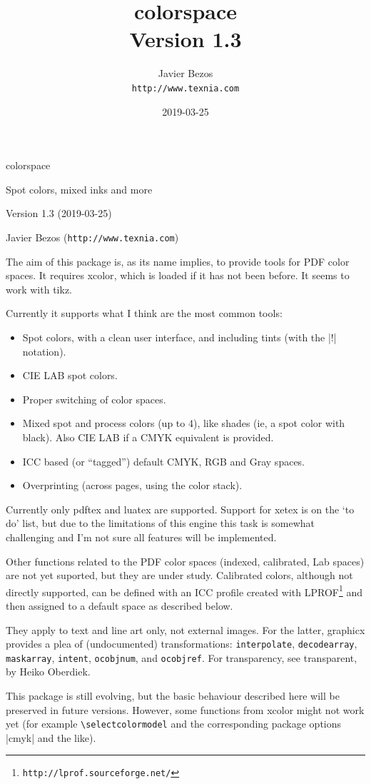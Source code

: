 \documentclass[a4paper]{ltxguide}
\title{\textsf{colorspace}\\\large Version 1.3}
\author{Javier Bezos\\\texttt{http://www.texnia.com}}
\date{2019-03-25}
\begin{document}
{\fontsize{48}{48}\selectfont colorspace\par}
{\LARGE Spot colors, mixed inks and more\par}
\vspace*{1ex}
Version 1.3 (2019-03-25)\par
Javier Bezos (\texttt{http://www.texnia.com})

\vspace*{6ex}

The aim of this package is, as its name implies, to provide tools for
PDF color spaces. It requires \textsf{xcolor}, which is loaded if it
has not been before. It seems to work with \textsf{tikz}.

Currently it supports what I think are the most common tools:
\begin{itemize}
\item Spot colors, with a clean user interface, and including tints
  (with the |!| notation).
\item CIE LAB spot colors.
\item Proper switching of color spaces.
\item Mixed spot and process colors (up to 4), like shades (ie, a spot
  color with black). Also CIE LAB if a CMYK equivalent is provided.
\item ICC based (or ``tagged'') default CMYK, RGB and Gray spaces.
\item Overprinting (across pages, using the color stack).
\end{itemize}
Currently only \textsf{pdftex} and \textsf{luatex} are
supported. Support for \textsf{xetex} is on the `to do' list, but due
to the limitations of this engine this task is somewhat challenging
and I'm not sure all features will be implemented.

Other functions related to the PDF color spaces (indexed, calibrated,
Lab spaces) are not yet suported, but they are under study. Calibrated
colors, although not directly supported, can be defined with an ICC
profile created with
LPROF\footnote{\texttt{http://lprof.sourceforge.net/}} and then
assigned to a default space as described below.

They apply to text and line art only, not external images. For the
latter, \textsf{graphicx} provides a plea of (undocumented)
transformations: \texttt{interpolate}, \texttt{decodearray},
\texttt{maskarray}, \texttt{intent}, \texttt{ocobjnum}, and
\texttt{ocobjref}. For transparency, see \textsf{transparent}, by
Heiko Oberdiek.

This package is still evolving, but the basic behaviour described here
will be preserved in future versions. However, some functions from
\textsf{xcolor} might not work yet (for example
\verb|\selectcolormodel| and the corresponding package options |cmyk|
and the like).
\end{document}
